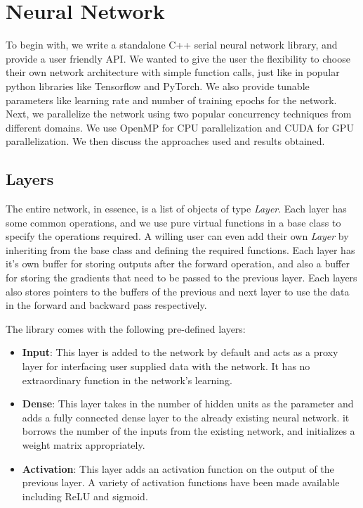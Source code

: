 \documentclass[conference]{IEEEtran}
\begin{document}
\section{Neural Network}
To begin with, we write a standalone C++ serial neural network library, and provide a user friendly API. We wanted to give the user the flexibility to choose their own network architecture with simple function calls, just like in popular python libraries like Tensorflow\cite{tensorflow} and PyTorch\cite{pytorch}. We also provide tunable parameters like learning rate and number of training epochs for the network. Next, we parallelize the network using two popular concurrency techniques from different domains. We use OpenMP for CPU parallelization and CUDA for GPU parallelization. We then discuss the approaches used and results obtained.

\subsection{Layers}
The entire network, in essence, is a list of objects of type \textit{Layer}. Each layer has some common operations, and we use pure virtual functions in a base class to specify the operations required. A willing user can even add their own \textit{Layer} by inheriting from the base class and defining the required functions. Each layer has it's own buffer for storing outputs after the forward operation, and also a buffer for storing the gradients that need to be passed to the previous layer. Each layers also stores pointers to the buffers of the previous and next layer to use the data in the forward and backward pass respectively.

The library comes with the following pre-defined layers:
\begin{itemize}
    \item \textbf{Input}: This layer is added to the network by default and acts as a proxy layer for interfacing user supplied data with the network. It has no extraordinary function in the network's learning.
    \item \textbf{Dense}: This layer takes in the number of hidden units as the parameter and adds a fully connected dense layer to the already existing neural network. it borrows the number of the inputs from the existing network, and initializes a weight matrix appropriately.
    \item \textbf{Activation}: This layer adds an activation function on the output of the previous layer. A variety of activation functions have been made available including ReLU and sigmoid.
\end{itemize}
\end{document}
